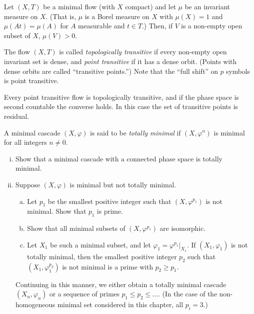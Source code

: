 \begin{exercise*}[5]
    Let $(X, T)$ be a minimal flow (with $X$ compact) and let $\mu$ be an invariant measure on $X$. (That is, $\mu$ is a Borel measure on $X$ with $\mu(X) = 1$ and $\mu(At) = \mu(A)$ for $A$ measurable and $t \in T$.) Then, if $V$ is a non-empty open subset of $X$, $\mu(V) > 0$.
\end{exercise*}



\begin{exercise*}[6]
    The flow $(X, T)$ is called \textit{topologically transitive} if every non-empty open invariant set is dense, and \textit{point transitive} if it has a dense orbit. (Points with dense orbits are called “transitive points.”) Note that the “full shift” on $p$ symbols is point transitive.

    Every point transitive flow is topologically transitive, and if the phase space is second countable the converse holds. In this case the set of transitive points is residual.
\end{exercise*}


\begin{exercise*}[7]
    A minimal cascade $(X, \varphi)$ is said to be \textit{totally minimal} if $(X, \varphi^n)$ is minimal for all integers $n \ne 0$.
    \begin{enumerate}[(i)]
        \item Show that a minimal cascade with a connected phase space is totally minimal.
        \item Suppose $(X, \varphi)$ is minimal but not totally minimal.
              \begin{enumerate}[(a)]
                  \item Let $p_1$ be the smallest positive integer such that $(X, \varphi^{p_1})$ is not minimal. Show that $p_1$ is prime.
                  \item Show that all minimal subsets of $(X, \varphi^{p_1})$ are isomorphic.
                  \item Let $X_1$ be such a minimal subset, and let $\varphi_1 = \varphi^{p_1}|_{X_1}$. If $(X_1, \varphi_1)$ is not totally minimal, then the smallest positive integer $p_2$ such that $(X_1, \varphi_1^{p_2})$ is not minimal is a prime with $p_2 \ge p_1$.
              \end{enumerate}
              Continuing in this manner, we either obtain a totally minimal cascade $(X_n, \varphi_n)$ or a sequence of primes $p_1 \le p_2 \le \dots$. (In the case of the non-homogeneous minimal set considered in this chapter, all $p_i = 3$.)
    \end{enumerate}
\end{exercise*}


